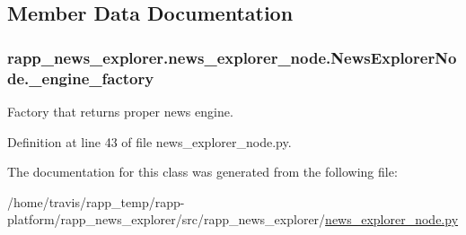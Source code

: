 \subsection{Member Data Documentation}
\hypertarget{classrapp__news__explorer_1_1news__explorer__node_1_1NewsExplorerNode_ad26828826489d4300018e796b8ee04e6}{
\subsubsection[{\-\_\-engine\-\_\-factory}]{\setlength{\rightskip}{0pt plus 5cm}rapp\-\_\-news\-\_\-explorer.\-news\-\_\-explorer\-\_\-node.\-News\-Explorer\-Node.\-\_\-engine\-\_\-factory\hspace{0.3cm}{\ttfamily [private]}}}\label{classrapp__news__explorer_1_1news__explorer__node_1_1NewsExplorerNode_ad26828826489d4300018e796b8ee04e6}


Factory that returns proper news engine. 



Definition at line 43 of file news\-\_\-explorer\-\_\-node.\-py.



The documentation for this class was generated from the following file\-:\begin{DoxyCompactItemize}
\item 
/home/travis/rapp\-\_\-temp/rapp-\/platform/rapp\-\_\-news\-\_\-explorer/src/rapp\-\_\-news\-\_\-explorer/\hyperlink{news__explorer__node_8py}{news\-\_\-explorer\-\_\-node.\-py}\end{DoxyCompactItemize}
